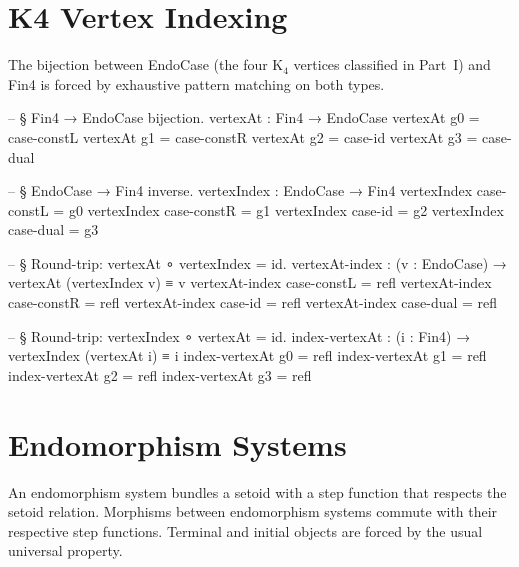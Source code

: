 \documentclass[11pt,a4paper]{book}
\def\texttt#1{#1}%
\def\texorpdfstring#1#2{#2}%
\begin{document}
\section{K\texorpdfstring{$_4$}{4} Vertex Indexing}

The bijection between \texttt{EndoCase} (the four K$_4$ vertices classified in
Part~I) and \texttt{Fin4} is forced by exhaustive pattern matching on both types.

\begin{code}
-- § Fin4 → EndoCase bijection.
vertexAt : Fin4 → EndoCase
vertexAt g0 = case-constL
vertexAt g1 = case-constR
vertexAt g2 = case-id
vertexAt g3 = case-dual

-- § EndoCase → Fin4 inverse.
vertexIndex : EndoCase → Fin4
vertexIndex case-constL = g0
vertexIndex case-constR = g1
vertexIndex case-id     = g2
vertexIndex case-dual   = g3

-- § Round-trip: vertexAt ∘ vertexIndex = id.
vertexAt-index : (v : EndoCase) → vertexAt (vertexIndex v) ≡ v
vertexAt-index case-constL = refl
vertexAt-index case-constR = refl
vertexAt-index case-id     = refl
vertexAt-index case-dual   = refl

-- § Round-trip: vertexIndex ∘ vertexAt = id.
index-vertexAt : (i : Fin4) → vertexIndex (vertexAt i) ≡ i
index-vertexAt g0 = refl
index-vertexAt g1 = refl
index-vertexAt g2 = refl
index-vertexAt g3 = refl
\end{code}

\section{Endomorphism Systems}

An endomorphism system bundles a setoid with a step function that respects the setoid
relation. Morphisms between endomorphism systems commute with their respective step
functions. Terminal and initial objects are forced by the usual universal property.
\end{document}
